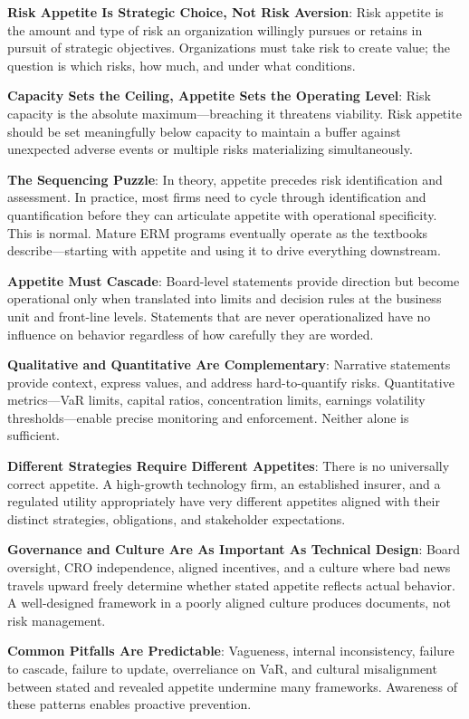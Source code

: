 \documentclass[11pt,openany]{book}
\begin{document}
\begin{keytakeaways}
\item
  \textbf{Risk Appetite Is Strategic Choice, Not Risk Aversion}: Risk appetite
  is the amount and type of risk an organization willingly pursues or retains in
  pursuit of strategic objectives. Organizations must take risk to create value;
  the question is which risks, how much, and under what conditions.
\item
  \textbf{Capacity Sets the Ceiling, Appetite Sets the Operating Level}: Risk
  capacity is the absolute maximum---breaching it threatens viability. Risk
  appetite should be set meaningfully below capacity to maintain a buffer
  against unexpected adverse events or multiple risks materializing
  simultaneously.
\item
  \textbf{The Sequencing Puzzle}: In theory, appetite precedes risk
  identification and assessment. In practice, most firms need to cycle through
  identification and quantification before they can articulate appetite with
  operational specificity. This is normal. Mature ERM programs eventually
  operate as the textbooks describe---starting with appetite and using it to
  drive everything downstream.
\item
  \textbf{Appetite Must Cascade}: Board-level statements provide direction but
  become operational only when translated into limits and decision rules at the
  business unit and front-line levels. Statements that are never operationalized
  have no influence on behavior regardless of how carefully they are worded.
\item
  \textbf{Qualitative and Quantitative Are Complementary}: Narrative statements
  provide context, express values, and address hard-to-quantify risks.
  Quantitative metrics---VaR limits, capital ratios, concentration limits,
  earnings volatility thresholds---enable precise monitoring and enforcement.
  Neither alone is sufficient.
\item
  \textbf{Different Strategies Require Different Appetites}: There is no
  universally correct appetite. A high-growth technology firm, an established
  insurer, and a regulated utility appropriately have very different appetites
  aligned with their distinct strategies, obligations, and stakeholder
  expectations.
\item
  \textbf{Governance and Culture Are As Important As Technical Design}:
  Board oversight, CRO independence, aligned incentives, and a culture where
  bad news travels upward freely determine whether stated appetite reflects
  actual behavior. A well-designed framework in a poorly aligned culture
  produces documents, not risk management.
\item
  \textbf{Common Pitfalls Are Predictable}: Vagueness, internal inconsistency,
  failure to cascade, failure to update, overreliance on VaR, and cultural
  misalignment between stated and revealed appetite undermine many frameworks.
  Awareness of these patterns enables proactive prevention.
\end{keytakeaways}
\end{document}
